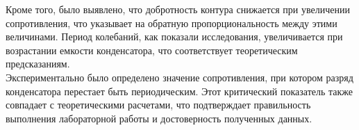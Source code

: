 \documentclass[14pt]{extarticle}
\begin{document}
    \noindent Кроме того, было выявлено, что добротность контура снижается при увеличении сопротивления, что указывает на обратную пропорциональность между этими величинами. Период колебаний, как показали исследования, увеличивается при возрастании емкости конденсатора, что соответствует теоретическим предсказаниям.\\

    \noindent Экспериментально было определено значение сопротивления, при котором разряд конденсатора перестает быть периодическим. Этот критический показатель также совпадает с теоретическими расчетами, что подтверждает правильность выполнения лабораторной работы и достоверность полученных данных.\\

    \clearpage
    \begin{figure}[h]
    \end{figure}
    \begin{figure}[h]
    \end{figure}
\end{document}
